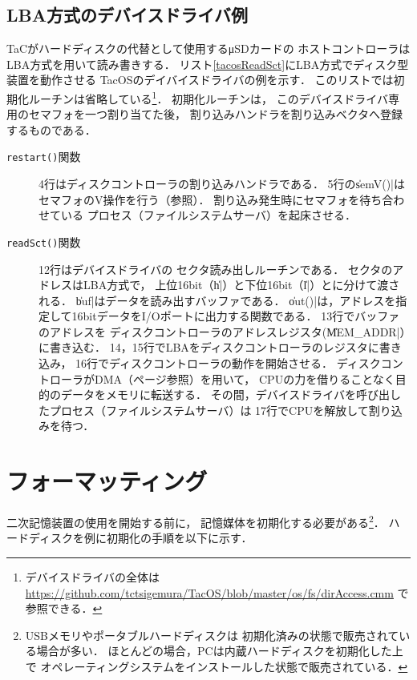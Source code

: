 \subsection{LBA方式のデバイスドライバ例}
TaCがハードディスクの代替として使用するμSDカードの
ホストコントローラはLBA方式を用いて読み書きする．
リスト\ref{tacosReadSct}にLBA方式でディスク型装置を動作させる
TacOSのデイバイスドライバの例を示す．
このリストでは初期化ルーチンは省略している\footnote{
デバイスドライバの全体は
\url{https://github.com/tctsigemura/TacOS/blob/master/os/fs/dirAccess.cmm}
で参照できる．}．
初期化ルーチンは，
このデバイスドライバ専用のセマフォを一つ割り当てた後，
割り込みハンドラを割り込みベクタへ登録するものである．



\begin{description}
\item[\texttt{restart()}関数]
  4行はディスクコントローラの割り込みハンドラである．
  5行の\|semV()|はセマフォのV操作を行う（参照）．
  割り込み発生時にセマフォを待ち合わせている
  プロセス（ファイルシステムサーバ）を起床させる．
\item[\texttt{readSct()}関数] 12行はデバイスドライバの
  セクタ読み出しルーチンである．
  セクタのアドレスはLBA方式で，
  上位16bit（\|h|）と下位16bit（\|l|）とに分けて渡される．
  \|buf|はデータを読み出すバッファである．
  \|out()|は，アドレスを指定して16bitデータをI/Oポートに出力する関数である．
  13行でバッファのアドレスを
  ディスクコントローラのアドレスレジスタ(\|MEM_ADDR|）に書き込む．
    14，15行でLBAをディスクコントローラのレジスタに書き込み，
    16行でディスクコントローラの動作を開始させる．
    ディスクコントローラがDMA（\pageref{dma}ページ参照）を用いて，
    CPUの力を借りることなく目的のデータをメモリに転送する．
    その間，デバイスドライバを呼び出したプロセス（ファイルシステムサーバ）は
    17行でCPUを解放して割り込みを待つ．
\end{description}

\section{フォーマッティング}
二次記憶装置の使用を開始する前に，
記憶媒体を初期化する必要がある\footnote{
USBメモリやポータブルハードディスクは
初期化済みの状態で販売されている場合が多い．
ほとんどの場合，PCは内蔵ハードディスクを初期化した上で
オペレーティングシステムをインストールした状態で販売されている．
}．
ハードディスクを例に初期化の手順を以下に示す．

